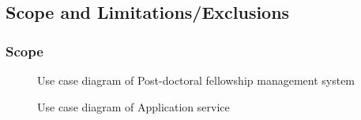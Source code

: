\documentclass[12pt]{article}
\begin{document}
		\subsection{Scope and Limitations/Exclusions} %
		\vspace{0.2in}
			
		
		\subsubsection{Scope}
		\vspace{0.2in}
		
			\begin{figure}[H]
				\centering				
				\caption{Use case diagram of Post-doctoral fellowship management system}
			\end{figure}
			
			\begin{figure}[H]
				\centering				
				\caption{Use case diagram of Application service}
			\end{figure}
									
\end{document}
